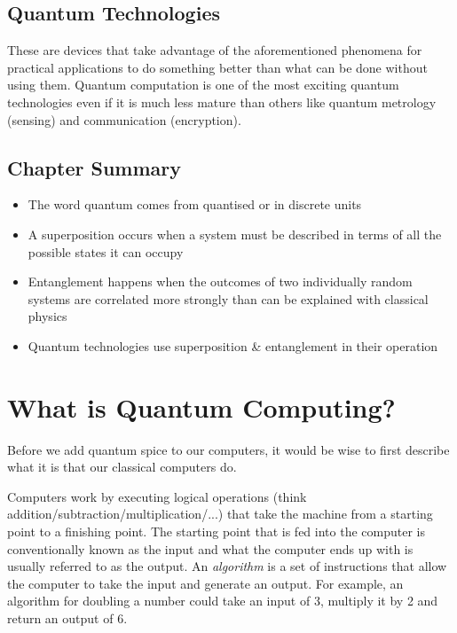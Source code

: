 \documentclass{book}
\begin{document}

\section{Quantum Technologies}

These are devices that take advantage of the aforementioned phenomena for practical applications to do something better than what can be done without using them. Quantum computation is one of the most exciting quantum technologies even if it is much less mature than others like quantum metrology (sensing) and communication (encryption).

\section{Chapter Summary} 

\begin{itemize}

    \item The word quantum comes from quantised or in discrete units 
    \item A superposition occurs when a system must be described in terms of all the possible states it can occupy
    \item Entanglement happens when the outcomes of two individually random systems are correlated more strongly than can be explained with classical physics 
    \item Quantum technologies use superposition \& entanglement in their operation 
    
\end{itemize}

\chapter{What is Quantum Computing?}

Before we add quantum spice to our computers, it would be wise to first describe what it is that our classical computers do. 

Computers work by executing logical operations (think addition/subtraction/multiplication/...) that take the machine from a starting point to a finishing point. The starting point that is fed into the computer is conventionally known as the input and what the computer ends up with is usually referred to as the output. An \textit{algorithm} is a set of instructions that allow the computer to take the input and generate an output. For example, an algorithm for doubling a number could take an input of 3, multiply it by 2 and return an output of 6. 
\end{document}

